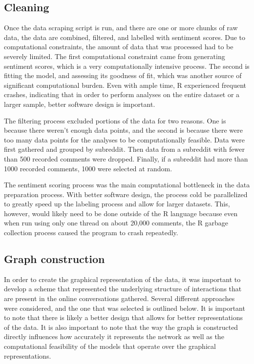 \documentclass[
]{article}
\begin{document}
\hypertarget{cleaning}{%
\subsection{Cleaning}\label{cleaning}}

Once the data scraping script is run, and there are one or more chunks of raw data, the data are combined, filtered, and labelled with sentiment scores. Due to computational constraints, the amount of data that was processed had to be severely limited. The first computational constraint came from generating sentiment scores, which is a very computationally intensive process. The second is fitting the model, and assessing its goodness of fit, which was another source of significant computational burden. Even with ample time, R experienced frequent crashes, indicating that in order to perform analyses on the entire dataset or a larger sample, better software design is important.

The filtering process excluded portions of the data for two reasons. One is because there weren't enough data points, and the second is because there were too many data points for the analyses to be computationally feasible. Data were first gathered and grouped by subreddit. Then data from a subreddit with fewer than 500 recorded comments were dropped. Finally, if a subreddit had more than 1000 recorded comments, 1000 were selected at random.

The sentiment scoring process was the main computational bottleneck in the data preparation process. With better software design, the process cold be parallelized to greatly speed up the labeling process and allow for larger datasets. This, however, would likely need to be done outside of the R language because even when run using only one thread on about 20,000 comments, the R garbage collection process caused the program to crash repeatedly.

\hypertarget{graph-construction}{%
\subsection{Graph construction}\label{graph-construction}}

In order to create the graphical representation of the data, it was important to develop a scheme that represented the underlying structure of interactions that are present in the online conversations gathered. Several different approaches were considered, and the one that was selected is outlined below. It is important to note that there is likely a better design that allows for better representations of the data. It is also important to note that the way the graph is constructed directly influences how accurately it represents the network as well as the computational feasibility of the models that operate over the graphical representations.
\end{document}
